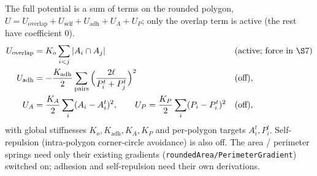 \documentclass[11pt]{article}
\numberwithin{equation}{section}
\begin{document}
The full potential is a sum of terms on the rounded polygon, $U=U_{\mathrm{overlap}}+U_{\mathrm{self}}
+U_{\mathrm{adh}}+U_A+U_P$; only the overlap term is active (the rest have coefficient $0$).
\begin{align}
  U_{\mathrm{overlap}}&=K_o\sum_{i<j}|A_i\cap A_j| && (\text{active; force in \S7})\\
  U_{\mathrm{adh}}&=-\frac{K_{\mathrm{adh}}}{2}\sum_{\text{pairs}}\Big(\frac{2\ell}{P^t_i+P^t_j}\Big)^2 && (\text{off}),\\
  U_A&=\frac{K_A}{2}\sum_i(A_i-A^t_i)^2,\qquad
  U_P=\frac{K_P}{2}\sum_i(P_i-P^t_i)^2 && (\text{off}),
\end{align}
with global stiffnesses $K_o,K_{\mathrm{adh}},K_A,K_P$ and per-polygon targets $A^t_i,P^t_i$.
Self-repulsion (intra-polygon corner-circle avoidance) is also off. The area / perimeter springs
need only their existing gradients (\texttt{roundedArea/PerimeterGradient}) switched on; adhesion and
self-repulsion need their own derivations.
\end{document}
